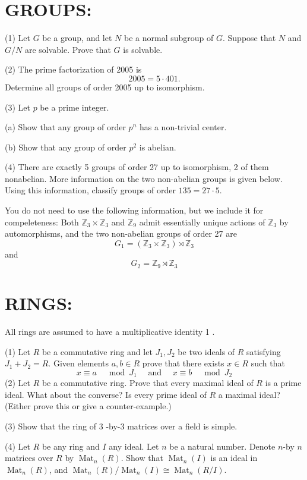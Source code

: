 \documentclass[10pt]{article}
\begin{document}
\section{GROUPS:}
(1) Let $G$ be a group, and let $N$ be a normal subgroup of $G$. Suppose that $N$ and $G / N$ are solvable. Prove that $G$ is solvable.

(2) The prime factorization of 2005 is
$$
2005=5 \cdot 401 .
$$
Determine all groups of order 2005 up to isomorphism.

(3) Let $p$ be a prime integer.

(a) Show that any group of order $p^{n}$ has a non-trivial center.

(b) Show that any group of order $p^{2}$ is abelian.

(4) There are exactly 5 groups of order 27 up to isomorphism, 2 of them nonabelian. More information on the two non-abelian groups is given below. Using this information, classify groups of order $135=27 \cdot 5$.

You do not need to use the following information, but we include it for compeleteness: Both $\mathbb{Z}_{3} \times \mathbb{Z}_{3}$ and $\mathbb{Z}_{9}$ admit essentially unique actions of $\mathbb{Z}_{3}$ by automorphisms, and the two non-abelian groups of order 27 are
$$
G_{1}=\left(\mathbb{Z}_{3} \times \mathbb{Z}_{3}\right) \rtimes \mathbb{Z}_{3}
$$
and
$$
G_{2}=\mathbb{Z}_{9} \rtimes \mathbb{Z}_{3}
$$

\section{RINGS:}
All rings are assumed to have a multiplicative identity 1 .

(1) Let $R$ be a commutative ring and let $J_{1}, J_{2}$ be two ideals of $R$ satisfying $J_{1}+J_{2}=R$. Given elements $a, b \in R$ prove that there exists $x \in R$ such that
$$
x \equiv a \quad \bmod J_{1} \quad \text { and } \quad x \equiv b \quad \bmod J_{2}
$$
(2) Let $R$ be a commutative ring. Prove that every maximal ideal of $R$ is a prime ideal. What about the converse? Is every prime ideal of $R$ a maximal ideal? (Either prove this or give a counter-example.)

(3) Show that the ring of 3 -by-3 matrices over a field is simple.

(4) Let $R$ be any ring and $I$ any ideal. Let $n$ be a natural number. Denote $n$-by $n$ matrices over $R$ by $\operatorname{Mat}_{n}(R)$. Show that $\operatorname{Mat}_{n}(I)$ is an ideal in $\operatorname{Mat}_{n}(R)$, and $\operatorname{Mat}_{n}(R) / \operatorname{Mat}_{n}(I) \cong \operatorname{Mat}_{n}(R / I)$.
\end{document}
